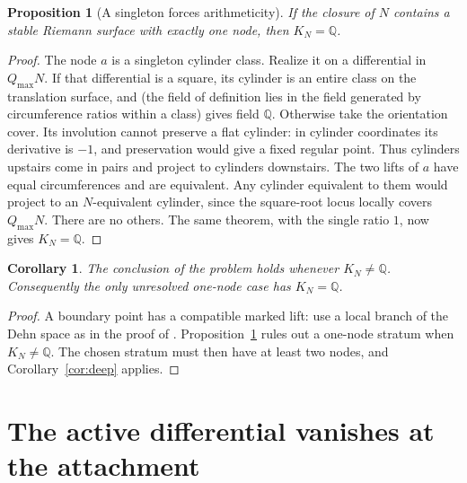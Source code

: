 \documentclass[12pt]{article}
\newtheorem{proposition}[theorem]{Proposition}
\newtheorem{corollary}[theorem]{Corollary}
\theoremstyle{remark}
\begin{document}
\begin{proposition}[A singleton forces arithmeticity]\label{prop:field}
If the closure of \(N\) contains a stable Riemann surface with
exactly one node, then \(K_N=\mathbb Q\).
\end{proposition}
\begin{proof}
The node \(a\) is a singleton cylinder class. Realize it
on a differential in \(Q_{\max}N\).
If that differential is a square, its cylinder is an entire
class on the translation surface, and
\cite[Theorem 7.1]{WrightCylinder} (the field of definition lies in
the field generated by circumference ratios within a class) gives
field \(\mathbb Q\).
Otherwise take the orientation cover. Its involution cannot
preserve a flat cylinder: in cylinder coordinates its
derivative is \(-1\), and preservation would give a fixed
regular point. Thus cylinders upstairs come in pairs and
project to cylinders downstairs. The two lifts of \(a\)
have equal circumferences and are equivalent. Any cylinder
equivalent to them would project to an \(N\)-equivalent
cylinder, since the square-root locus locally covers
\(Q_{\max}N\). There are no others. The same theorem, with the
single ratio \(1\), now gives \(K_N=\mathbb Q\).
\end{proof}

\begin{corollary}\label{cor:nonarithmetic}
The conclusion of the problem holds whenever \(K_N\ne\mathbb Q\).
Consequently the only unresolved one-node case has \(K_N=\mathbb Q\).
\end{corollary}
\begin{proof}
A boundary point has a compatible marked lift: use a local branch
of the Dehn space as in the proof of \cite[Lemma 3.13]{AHW}.
Proposition~\ref{prop:field} rules out a one-node stratum when
\(K_N\ne\mathbb Q\). The chosen stratum must then have at least
two nodes, and Corollary~\ref{cor:deep} applies.
\end{proof}

\section{The active differential vanishes at the attachment}\label{sec:sewing}
\end{document}
